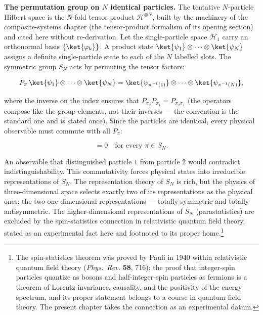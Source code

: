 \medskip\noindent\textbf{The permutation group on $N$ identical particles.}
The tentative $N$-particle Hilbert space is the $N$-fold tensor product $\mathcal{H}^{\otimes N}$, built by the machinery of the composite-systems chapter (the tensor-product formalism of its opening section) and cited here without re-derivation. Let the single-particle space $\mathcal{H}_1$ carry an orthonormal basis $\{\ket{\varphi_k}\}$. A product state $\ket{\psi_1} \otimes \cdots \otimes \ket{\psi_N}$ assigns a definite single-particle state to each of the $N$ labelled slots. The symmetric group $S_N$ acts by permuting the tensor factors:
\begin{linenomath}
    \begin{equation}
        P_\pi\,\ket{\psi_1} \otimes \cdots \otimes \ket{\psi_N}
        = \ket{\psi_{\pi^{-1}(1)}} \otimes \cdots \otimes \ket{\psi_{\pi^{-1}(N)}},
        \label{eq:permutation-action}
    \end{equation}
\end{linenomath}
where the inverse on the index ensures that $P_{\pi_2}P_{\pi_1} = P_{\pi_2\pi_1}$ (the operators compose like the group elements, not their inverses --- the convention is the standard one and is stated once). Since the particles are identical, every physical observable must commute with all $P_\pi$:
\begin{linenomath}
    \begin{equation*}
        [O, P_\pi] = 0 \quad\text{for every }\pi\in S_N.
    \end{equation*}
\end{linenomath}
An observable that distinguished particle $1$ from particle $2$ would contradict indistinguishability. This commutativity forces physical states into irreducible representations of $S_N$. The representation theory of $S_N$ is rich, but the physics of three-dimensional space selects exactly two of its representations as the physical ones: the two one-dimensional representations --- totally symmetric and totally antisymmetric. The higher-dimensional representations of $S_N$ (parastatistics) are excluded by the spin-statistics connection in relativistic quantum field theory, stated as an experimental fact here and footnoted to its proper home.\footnote{The spin-statistics theorem was proved by Pauli in 1940 within relativistic quantum field theory (\emph{Phys.\ Rev.} \textbf{58}, 716); the proof that integer-spin particles quantize as bosons and half-integer-spin particles as fermions is a theorem of Lorentz invariance, causality, and the positivity of the energy spectrum, and its proper statement belongs to a course in quantum field theory. The present chapter takes the connection as an experimental datum.}

